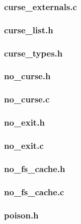 \documentclass[a4paper,11pt]{article} \usepackage{anysize}
\begin{document}
\subsubsection*{curse\_externals.c}

\subsubsection*{curse\_list.h}

\subsubsection*{curse\_types.h}


\subsubsection*{no\_curse.h}

\subsubsection*{no\_curse.c}


\subsubsection*{no\_exit.h}

\subsubsection*{no\_exit.c}


\subsubsection*{no\_fs\_cache.h}

\subsubsection*{no\_fs\_cache.c}


\subsubsection*{poison.h}

\end{document}
